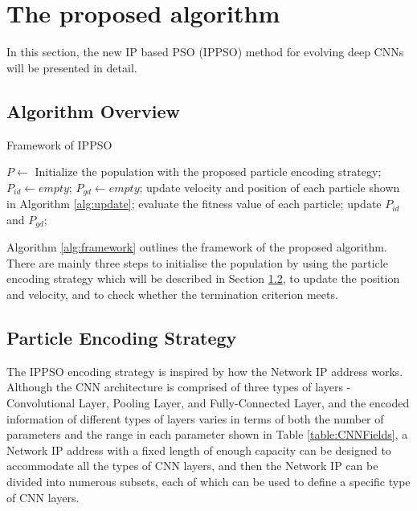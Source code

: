 \documentclass[conference]{IEEEtran}
\begin{document}
\section{The proposed algorithm}\label{sec:ProposedAlgorithm}
In this section, the new IP based PSO (IPPSO) method for evolving deep CNNs will be presented in detail. 


\subsection{Algorithm Overview}
\begin{algorithm}
	\caption{Framework of IPPSO}
	\label{alg:framework}
	\begin{algorithmic}
		\renewcommand{\algorithmicrequire}{\textbf{Input:}}
		\renewcommand{\algorithmicensure}{\textbf{Output:}}
		\STATE $P \leftarrow$ Initialize the population with the proposed particle encoding strategy;
		\STATE $P_{id} \leftarrow empty$;
		\STATE $P_{gd} \leftarrow empty$;
			\STATE update velocity and position of each particle shown in Algorithm \ref{alg:update};
			\STATE evaluate the fitness value of each particle;
			\STATE update $P_{id}$ and $P_{gd}$;
		\ENDWHILE		
	\end{algorithmic}
\end{algorithm}

Algorithm \ref{alg:framework} outlines the framework of the proposed algorithm. There are mainly three steps to initialise the population by using the particle encoding strategy which will be described in Section \ref{sec:ParticleEncodingStrategy}, to update the position and velocity, and to check whether the termination criterion meets.

\subsection{Particle Encoding Strategy}\label{sec:ParticleEncodingStrategy}

The IPPSO encoding strategy is inspired by how the Network IP address works. Although the CNN architecture is comprised of three types of layers - Convolutional Layer, Pooling Layer, and Fully-Connected Layer, and the encoded information of different types of layers varies in terms of both the number of parameters and the range in each parameter shown in Table \ref{table:CNNFields}, a Network IP address with a fixed length of enough capacity can be designed to accommodate all the types of CNN layers, and then the Network IP can be divided into numerous subsets, each of which can be used to define a specific type of CNN layers. 
\end{document}
